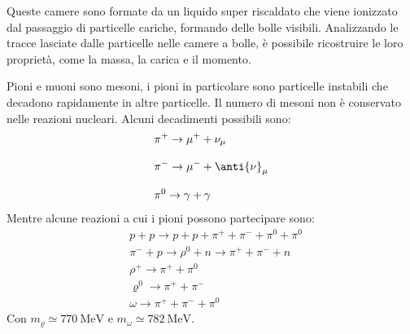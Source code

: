 Queste camere sono formate da un liquido super riscaldato che viene ionizzato dal passaggio di particelle cariche, formando delle bolle visibili. Analizzando le tracce lasciate dalle particelle nelle camere a bolle, è possibile ricostruire le loro proprietà, come la massa, la carica e il momento.


Pioni e muoni sono mesoni, i pioni in particolare sono particelle instabili che decadono rapidamente in altre particelle. Il numero di mesoni non è conservato nelle reazioni nucleari. Alcuni decadimenti possibili sono:
\begin{equation}
    \begin{split}
      &\pi^+ \to \mu^+ + \nu_{\mu} \\[8pt]
      &\pi^- \to \mu^- + \anti{\nu}_{\mu} \\[8pt]
      &\pi^0 \to \gamma + \gamma
    \end{split}
\end{equation}
Mentre alcune reazioni a cui i pioni possono partecipare sono:
\begin{equation}
    \begin{split}
      &p + p \to p + p + \pi^+ + \pi^- + \pi^0 + \pi^0\\[8pt]
      &\pi^- + p \to \rho^0 + n \to \pi^+ + \pi^- + n \\[8pt]
      &\rho^+ \to \pi^+ + \pi^0 \\[8pt]
      &\varrho^0 \to \pi^+ + \pi^- \\[8pt]
      &\omega \to \pi^+ + \pi^- + \pi^0
    \end{split}
\end{equation}
Con $m_{\varrho} \simeq \qty{770}{\mega\electronvolt}$ e $m_{\omega} \simeq \qty{782}{\mega\electronvolt}$.\\
